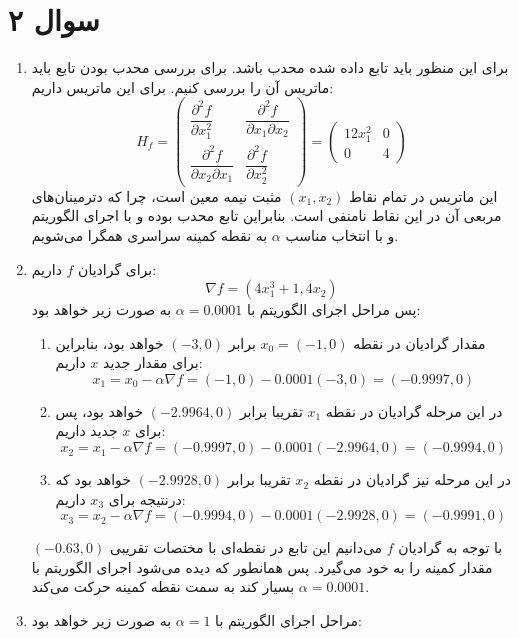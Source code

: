 \documentclass[a4paper, 12pt]{article}
\begin{document}
\section*{سوال ۲}
\begin{enumerate}[آ)]
	\item
	برای این منظور باید تابع داده شده محدب باشد. برای بررسی محدب بودن تابع باید ماتریس  آن را بررسی کنیم. برای این ماتریس داریم:
	\[
	H_f = \left(\begin{array}{cc}
		\dfrac{\partial^2 f}{\partial x_1^2} & \dfrac{\partial^2 f}{\partial x_1\partial x_2} \\[0.75em]
		\dfrac{\partial^2 f}{\partial x_2\partial x_1} & \dfrac{\partial^2 f}{\partial x_2^2}
	\end{array}\right) = \left(\begin{array}{cc}
		12x_1^2 & 0 \\
		0 & 4
	\end{array}\right)
	\]
	این ماتریس در تمام نقاط
	$(x_1, x_2)$
	مثبت نیمه معین است، چرا که دترمینان‌های مربعی آن در این نقاط نامنفی است. بنابراین تابع محدب بوده و با اجرای الگوریتم
	و با انتخاب مناسب $\alpha$ به نقطه کمینه سراسری همگرا می‌شویم.
	\item
	برای گرادیان $f$ داریم:
	\[
	\nabla f = (4x_1 ^3 + 1, 4x_2)
	\]
	پس مراحل اجرای الگوریتم با
	$\alpha = 0.0001$
	به صورت زیر خواهد بود:
	\begin{enumerate}[1.]
		\item
		مقدار گرادیان در نقطه
		$x_0 = (-1,0)$
		برابر 
		$(-3,0)$
		خواهد بود، بنابراین برای مقدار جدید $x$ داریم:
		\[
		x_{1} = x_{0} - \alpha \nabla f = (-1,0) - 0.0001(-3,0) = (-0.9997,0) 
		\]
		\item
		در این مرحله گرادیان در نقطه $x_1$ تقریبا برابر 
		$(-2.9964,0)$
		خواهد بود، پس برای $x$ جدید داریم:
		\[
		x_2 = x_1 - \alpha \nabla f = (-0.9997,0) - 0.0001(-2.9964,0) = (-0.9994,0)
		\]
		\item
		در این مرحله نیز گرادیان در نقطه $x_2$ تقریبا برابر
		$(-2.9928,0)$
		خواهد بود که درنتیجه برای $x_3$ داریم:
		\[
		x_3 = x_2 - \alpha \nabla f = (-0.9994,0) - 0.0001(-2.9928,0) = (-0.9991,0)
		\]
	\end{enumerate}
	با توجه به گرادیان $f$ می‌دانیم این تابع در نقطه‌ای با مختصات تقریبی 
	$(-0.63,0)$
	مقدار کمینه را به خود می‌گیرد. پس همانطور که دیده می‌شود اجرای الگوریتم با 
	$\alpha = 0.0001$
	بسیار کند به سمت نقطه کمینه حرکت می‌کند.
	\item
	مراحل اجرای الگوریتم با
	$\alpha = 1$
	به صورت زیر خواهد بود:
	\begin{enumerate}[1.]

\end{enumerate}
\end{enumerate}
\end{document}
